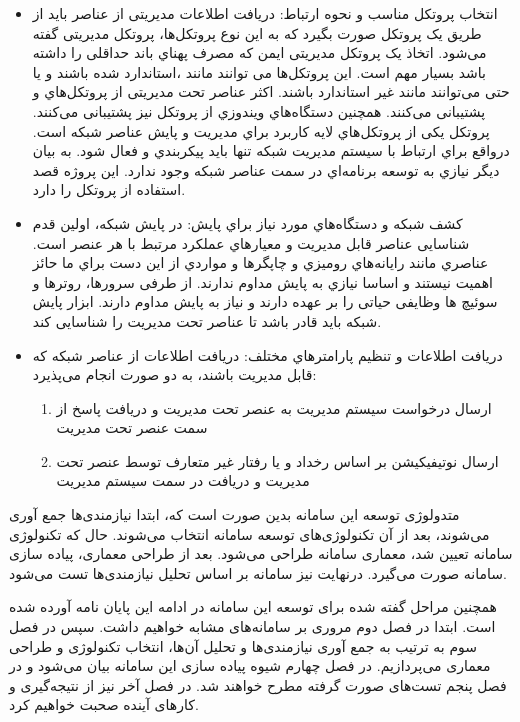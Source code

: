 \begin{itemize}
    \item انتخاب پروتکل مناسب و نحوه ارتباط: دریافت اطلاعات مدیریتی از عناصر باید از طریق یک پروتکل صورت بگیرد که به این نوع پروتکل‌ها، پروتکل مدیریتی گفته می‌شود. اتخاذ یک پروتکل مدیریتی ایمن که مصرف پهناي باند حداقلی را داشته باشد بسیار مهم است. این پروتکل‌ها می توانند مانند ،استاندارد شده باشند و یا حتی می‌توانند مانند  غیر استاندارد باشند. اکثر عناصر تحت مدیریتی از پروتکل‌هاي  و  پشتیبانی می‌کنند. همچنین دستگاه‌هاي ویندوزي از پروتکل  نیز پشتیبانی می‌کنند. پروتکل  یکی از پروتکل‌هاي لایه کاربرد براي مدیریت و پایش عناصر شبکه است. درواقع براي ارتباط با سیستم مدیریت شبکه تنها باید پیکربندي و فعال شود. به بیان دیگر نیازي به توسعه برنامه‌اي در سمت عناصر شبکه وجود ندارد. این پروژه قصد استفاده از پروتکل  را دارد.
\newpage
    \item کشف شبکه و دستگاه‌هاي مورد نیاز براي پایش: در پایش شبکه، اولین قدم شناسایی عناصر قابل مدیریت و معیارهاي عملکرد مرتبط با هر عنصر است. عناصري مانند رایانه‌هاي رومیزي و چاپگرها و مواردي از این دست براي ما حائز اهمیت نیستند و اساسا نیازي به پایش مداوم ندارند. از طرفی سرورها، روترها و سوئیچ ها وظایفی حیاتی را بر عهده دارند و نیاز به پایش مداوم دارند. ابزار پایش شبکه باید قادر باشد تا عناصر تحت مدیریت را شناسایی کند.
    \item دریافت اطلاعات و تنظیم پارامترهاي مختلف: دریافت اطلاعات از عناصر شبکه که قابل مدیریت باشند، به دو صورت انجام می‌پذیرد:
    \begin{enumerate}
        \item ارسال درخواست سیستم مدیریت به عنصر تحت مدیریت و دریافت پاسخ از سمت عنصر تحت مدیریت
        \item ارسال نوتیفیکیشن بر اساس رخداد و یا رفتار غیر متعارف توسط عنصر تحت مدیریت و دریافت در سمت سیستم مدیریت
    \end{enumerate}
\end{itemize}


متدولوژی توسعه این سامانه بدین صورت است که، ابتدا نیازمندی‌ها جمع آوری می‌شوند، بعد از آن تکنولوژی‌های توسعه سامانه انتخاب می‌شوند. حال که تکنولوژی سامانه تعیین شد، معماری سامانه طراحی می‌شود. بعد از طراحی معماری، پیاده سازی سامانه صورت می‌گیرد. درنهایت نیز سامانه بر اساس تحلیل نیازمندی‌ها تست می‌شود. 

همچنین مراحل گفته شده برای توسعه این سامانه در ادامه این پایان نامه آورده شده است. ابتدا در فصل دوم مروری بر سامانه‌های مشابه خواهیم داشت. سپس در فصل سوم به ترتیب به جمع آوری نیازمندی‌ها و تحلیل آن‌ها، انتخاب تکنولوژی و طراحی معماری می‌پردازیم. در فصل چهارم شیوه پیاده سازی این سامانه بیان می‌شود و در فصل پنجم تست‌های صورت گرفته مطرح خواهند شد. در فصل آخر نیز از نتیجه‌گیری و کارهای آینده صحبت خواهیم کرد.

